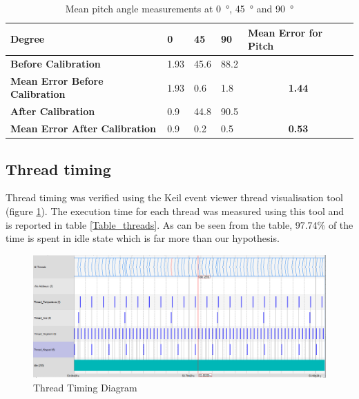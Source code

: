 \documentclass[12pt]{article}
\begin{document}
\begin{table}[!h]
\centering
\caption{Mean pitch angle measurements at \SI{0}{\degree}, \SI{45}{\degree} and \SI{90}{\degree}}
\label{Table_acc_pitch}
\begin{tabular}{lllll}
\hline
\textbf{Degree} & \textbf{0} & \textbf{45} & \textbf{90} & \textbf{Mean Error for Pitch}
\\ \hline
\textbf{Before Calibration} & 1.93 & 45.6 & 88.2
\\ \hline
\textbf{Mean Error Before Calibration} & 1.93 & 0.6 & 1.8 & \multicolumn{1}{c}{\textbf{1.44}}
\\ \hline
\textbf{After Calibration} & 0.9 & 44.8 & 90.5
\\ \hline
\textbf{Mean Error After Calibration} & 0.9 & 0.2 & 0.5 & \multicolumn{1}{c}{\textbf{0.53}}
\\ \hline
\end{tabular}
\end{table}

\newpage

\subsection{Thread timing}
Thread timing was verified using the Keil event viewer thread visualisation tool (figure \ref{fig:threadstiming}). The execution time for each thread was measured using this tool and is reported in table \ref{Table_threads}. As can be seen from the table, 97.74\% of the time is spent in idle state which is far more than our hypothesis.

\begin{figure}[!h]
 \centering
 \includegraphics[scale=0.50]{images/threads1.png}
 \caption{Thread Timing Diagram}
 \label{fig:threadstiming}
\end{figure}
\end{document}
